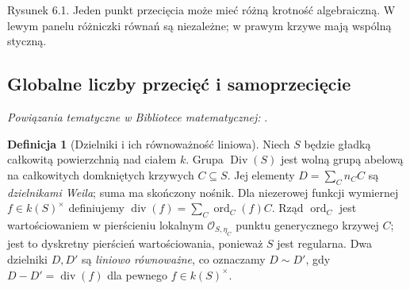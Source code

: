 \documentclass[11pt,a4paper,openany]{report}
\numberwithin{equation}{section}
\theoremstyle{plain}
\theoremstyle{definition}
\newtheorem{definicja}[twierdzenie]{Definicja}
\theoremstyle{remark}
\begin{document}
\begin{center}
\begin{minipage}{\linewidth}
\centering
{}

{\small Rysunek 6.1. Jeden punkt przecięcia może mieć różną krotność algebraiczną. W lewym panelu różniczki równań są niezależne; w prawym krzywe mają wspólną styczną.}\par
\end{minipage}
\end{center}

\subsection{Globalne liczby przecięć i samoprzecięcie}

\noindent\emph{Powiązania tematyczne w Bibliotece matematycznej:} .


\begin{definicja}[Dzielniki i ich równoważność liniowa]
\label{def:ga6-divisor-group}
Niech $S$ będzie gładką całkowitą powierzchnią nad ciałem $k$.
Grupa $\operatorname{Div}(S)$ jest wolną grupą abelową na
całkowitych domkniętych krzywych $C\subseteq S$. Jej elementy
$D=\sum_C n_C C$ są \emph{dzielnikami Weila}; suma ma skończony
nośnik. Dla niezerowej funkcji wymiernej $f\in k(S)^\times$
definiujemy $\operatorname{div}(f)=\sum_C\operatorname{ord}_C(f)C$.
Rząd $\operatorname{ord}_C$ jest wartościowaniem w pierścieniu lokalnym
$\mathcal O_{S,\eta_C}$ punktu generycznego krzywej $C$;
jest to dyskretny pierścień wartościowania, ponieważ $S$ jest
regularna. Dwa dzielniki $D,D'$ są \emph{liniowo równoważne},
co oznaczamy $D\sim D'$, gdy $D-D'=\operatorname{div}(f)$
dla pewnego $f\in k(S)^\times$.
\end{definicja}
\end{document}
